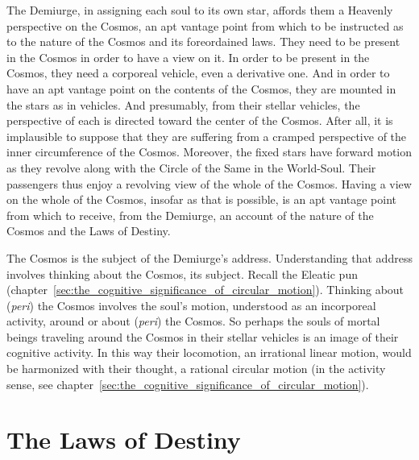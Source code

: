 The Demiurge, in assigning each soul to its own star, affords them a Heavenly perspective on the Cosmos, an apt vantage point from which to be instructed as to the nature of the Cosmos and its foreordained laws. They need to be present in the Cosmos in order to have a view on it. In order to be present in the Cosmos, they need a corporeal vehicle, even a derivative one. And in order to have an apt vantage point on the contents of the Cosmos, they are mounted in the stars as in vehicles. And presumably, from their stellar vehicles, the perspective of each is directed toward the center of the Cosmos. After all, it is implausible to suppose that they are suffering from a cramped perspective of the inner circumference of the Cosmos. Moreover, the fixed stars have forward motion as they revolve along with the Circle of the Same in the World-Soul. Their passengers thus enjoy a revolving view of the whole of the Cosmos. Having a view on the whole of the Cosmos, insofar as that is possible, is an apt vantage point from which to receive, from the Demiurge, an account of the nature of the Cosmos and the Laws of Destiny. 

The Cosmos is the subject of the Demiurge's address. Understanding that address involves thinking about the Cosmos, its subject. Recall the Eleatic pun (chapter~\ref{sec:the_cognitive_significance_of_circular_motion}). Thinking about (\emph{peri}) the Cosmos involves the soul's motion, understood as an incorporeal activity, around or about (\emph{peri}) the Cosmos. So perhaps the souls of mortal beings traveling around the Cosmos in their stellar vehicles is an image of their cognitive activity. In this way their locomotion, an irrational linear motion, would be harmonized with their thought, a rational circular motion (in the activity sense, see chapter~\ref{sec:the_cognitive_significance_of_circular_motion}).



\section{The Laws of Destiny} %
\label{sec:the_laws_of_destiny}

